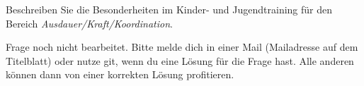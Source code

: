 \begin{question}{4}
    Beschreiben Sie die Besonderheiten im Kinder- und Jugendtraining für den Bereich \emph{Ausdauer/Kraft/Koordination}.
\end{question}
\begin{solution}
    Frage noch nicht bearbeitet. Bitte melde dich in einer Mail (Mailadresse auf dem Titelblatt) oder nutze git, wenn du eine Lösung für die Frage hast. Alle anderen können dann von einer korrekten Lösung profitieren.
\end{solution}